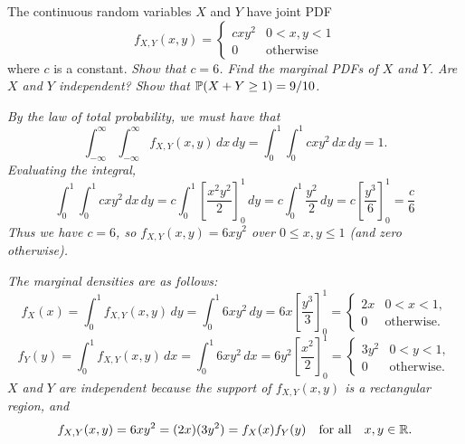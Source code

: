 \begin{example}
The continuous random variables $X$ and $Y$ have joint PDF
\[
f_{X,Y}(x,y) = 
\left\{\begin{array}{ll}
	cxy^2	& 0< x,y< 1 \\
	0		& \text{otherwise}
\end{array}\right.
\]
where $c$ is a constant.
\ben
\it Show that $c=6$.
\it Find the marginal PDFs of $X$ and $Y$. Are $X$ and $Y$ independent?
\it Show that $\mathbb{P}(X+Y\geq 1)=9/10$.
\een

\end{example}
\begin{solution}

\ben
\it %
By the law of total probability, we must have that 
\[
\int_{-\infty}^{\infty}\int_{-\infty}^{\infty}f_{X,Y}(x,y)\,dx\,dy = \int_0^1\int_0^1 cxy^2\,dx\,dy = 1.
\]
Evaluating the integral, 
\[
\int_0^1\int_0^1 cxy^2\,dx\,dy 
	= c\int_0^1 \left[\frac{x^2y^2}{2}\right]_0^1\,dy
	= c\int_0^1 \frac{y^2}{2}\,dy
	= c\left[\frac{y^3}{6}\right]_0^1
	= \frac{c}{6}
\]
Thus we have $c=6$, so $f_{X,Y}(x,y)=6xy^2$ over $0\leq x,y\leq 1$ (and zero otherwise).

\it %
The marginal densities are as follows:
\[ 
f_X(x) 	= \int_0^1 f_{X,Y}(x,y)\,dy = \int_0^1 6xy^2\,dy = 6x\left[\frac{y^3}{3}\right]_0^1 		
	= \left\{\begin{array}{ll} 
		2x	& 0< x< 1, \\ 
		0 	& \text{otherwise.}
	\end{array}\right.
\]
\[
f_Y(y) 	= \int_0^1 f_{X,Y}(x,y)\,dx = \int_0^1 6xy^2\,dx = 6y^2\left[\frac{x^2}{2}\right]_0^1	
	= \left\{\begin{array}{ll} 
		3y^2		& 0< y< 1, \\ 
		0 		& \text{otherwise.}
	\end{array}\right.
\]
$X$ and $Y$ are independent because the support of $f_{X,Y}(x,y)$ is a rectangular region, and
\[
f_{X,Y}(x,y) = 6xy^2 = (2x)(3y^2) = f_X(x)f_Y(y) \text{\quad for all}\quad x,y\in\mathbb{R}.
\]



\end{solution}
